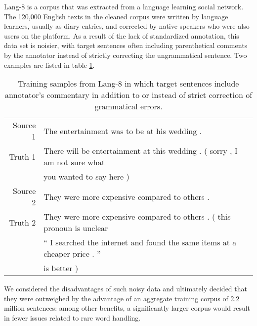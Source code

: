 Lang-8 is a corpus that was extracted from a language learning social network. The 120,000 English texts in the cleaned corpus were written by language learners, usually as diary entries, and corrected by native speakers who were also users on the platform. As a result of the lack of standardized annotation, this data set is noisier, with target sentences often including parenthetical comments by the annotator instead of strictly correcting the ungrammatical sentence. Two examples are listed in table \ref{tab:training-lang8}.
\begin{table}[h]
\centering
\begin{tabular}{ r l }
\tabularnewline \hline \hline
Source 1 & The entertainment was to be at his wedding . \\
Truth 1 & There will be entertainment at this wedding . ( sorry , I am not sure what \\
& you wanted to say here ) \\
\hline
Source 2 & They were more expensive compared to others . \\
Truth 2 & They were more expensive compared to others . ( this pronoun is unclear \\
& `` I searched the internet and found the same items at a cheaper price . '' \\
& is better ) \\
\hline
\end{tabular}
\caption{Training samples from Lang-8 in which target sentences include annotator's commentary in addition to or instead of strict correction of grammatical errors.}
\label{tab:training-lang8}
\end{table}

We considered the disadvantages of such noisy data and ultimately decided that they were outweighed by the advantage of an aggregate training corpus of 2.2 million sentences: among other benefits, a significantly larger corpus would result in fewer issues related to rare word handling.

